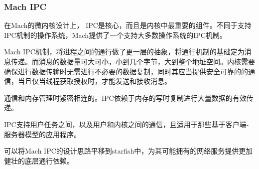 \subsubsection*{Mach IPC}


在Mach的微内核设计上， IPC是核心，而且是内核中最重要的组件。不同于支持IPC机制的操作系统，Mach提供了一个支持大多数操作系统的IPC机制。

Mach IPC机制，将进程之间的通行做了更一层的抽象，将通行机制的基础定为消息传递。而消息的数据量可大可小，小到几个字节，大到整个地址空间。内核需要确保进行数据传输时无需进行不必要的数据复制，同时其应当提供安全可靠的的通信，当且仅当线程获取授权时，才能发送和接收消息。

通信和内存管理时紧密相连的。IPC依赖于内存的写时复制进行大量数据的有效传递。

IPC支持用户任务之间，以及用户和内核之间的通信，且适用于那些基于客户端-服务器模型的应用程序。

可以将Mach IPC的设计思路平移到starfish中，为其可能拥有的网络服务提供更加健壮的底层通行依赖。